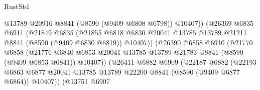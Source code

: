 \begin{lexlean}{RustStd}
\begin{coremodule}
                                        @13789
                                        @20916
                                        @8841
                                        (@8590 (@9409 @6808 @6798))
                                        @10407))
                                    (@26369
                                      @6835
                                      @6911
                                      (@21849
                                        @6835
                                        (@21855
                                          @6818
                                          @6830
                                          @20041
                                          @13785
                                          @13789
                                          @21211
                                          @8841
                                          (@8590 (@9409 @6830 @6819))
                                          @10407))
                                      (@26390
                                        @6858
                                        @6910
                                        (@21770
                                          @6858
                                          (@21776
                                            @6840
                                            @6853
                                            @20041
                                            @13785
                                            @13789
                                            @21783
                                            @8841
                                            (@8590 (@9409 @6853 @6841))
                                            @10407))
                                        (@26411
                                          @6882
                                          @6909
                                          (@22187
                                            @6882
                                            (@22193
                                              @6863
                                              @6877
                                              @20041
                                              @13785
                                              @13789
                                              @22200
                                              @8841
                                              (@8590 (@9409 @6877 @6864))
                                              @10407))
                                          (@13751
                                            @6907

\end{coremodule}
\end{lexlean}
